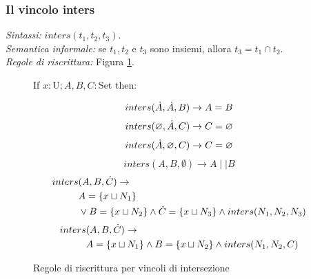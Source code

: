 \documentclass[12pt,a4paper,openright]{book}  %
\begin{document}

\subsubsection{Il vincolo inters}

\textit{Sintassi:} $inters(t_1,t_2,t_3)$.\\
\noindent\textit{Semantica informale:} se $t_1, t_2$ e $t_3$ sono insiemi, allora $t_3 = t_1 \cap t_2$.\\
\noindent\textit{Regole di riscrittura:} Figura \ref{fig:intersect_constraints}.

\begin{figure}
	\begin{tcolorbox}[colframe=black, colback=white, sharp corners]
		\setcounter{equation}{7}
		\renewcommand{\theequation}{$\cup$\textsubscript{\arabic{equation}}}

		If $x: \text{U}; A, B, C: \text{Set}$ then:

		\begin{equation}
		inters(\dot{A}, \dot{A}, B) \to A = B
		\end{equation}
		\begin{equation}
		inters(\varnothing, \dot{A}, C) \to C = \varnothing
		\end{equation}
		\begin{equation}
		inters(\dot{A}, \varnothing, C) \to C = \varnothing
		\end{equation}
		\begin{equation}
		inters(A,B,\emptyset) \to A \mid\mid B
		\end{equation}
		\begin{equation}
		\begin{split}
		inters & (A,B,\dot{C}) \to \\
		& A = \{ x \sqcup N_1 \} \\
		& \lor B = \{ x \sqcup N_2 \} \land \dot{C} = \{ x \sqcup N_3 \} \land inters(N_1, N_2, N_3)
		\end{split}
		\end{equation}
		\begin{equation}
		\begin{split}
		inters & (A,B,\dot{C}) \to \\
		& A = \{ x \sqcup N_1 \} \land B = \{ x \sqcup N_2 \} \land inters(N_1, N_2, C)
		\end{split}
		\end{equation}

	\end{tcolorbox}

	\caption{Regole di riscrittura per vincoli di intersezione}
	\label{fig:intersect_constraints}
\end{figure}
\end{document}
